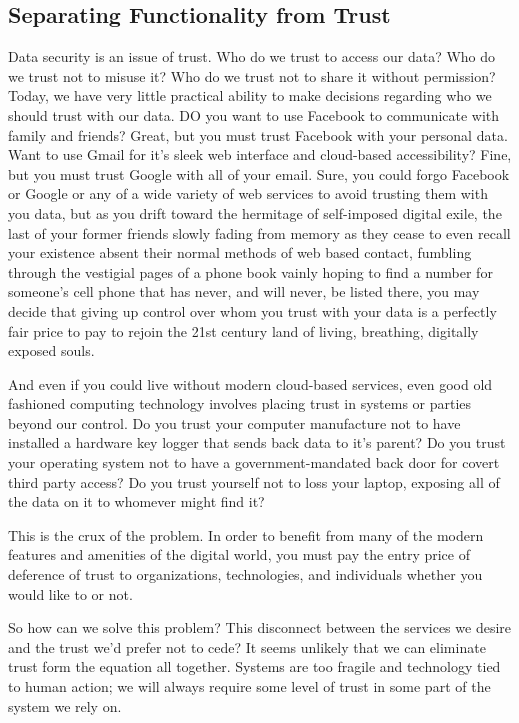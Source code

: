 \subsection{Separating Functionality from Trust}

Data security is an issue of trust. Who do we trust to access our
data? Who do we trust not to misuse it? Who do we trust not to share
it without permission? Today, we have very little practical ability to
make decisions regarding who we should trust with our data. DO you
want to use Facebook to communicate with family and friends? Great,
but you must trust Facebook with your personal data. Want to use Gmail
for it's sleek web interface and cloud-based accessibility? Fine, but
you must trust Google with all of your email. Sure, you could forgo
Facebook or Google or any of a wide variety of web services to avoid
trusting them with you data, but as you drift toward the hermitage of
self-imposed digital exile, the last of your former friends slowly
fading from memory as they cease to even recall your existence absent
their normal methods of web based contact, fumbling through the
vestigial pages of a phone book vainly hoping to find a number for
someone's cell phone that has never, and will never, be listed there,
you may decide that giving up control over whom you trust with your
data is a perfectly fair price to pay to rejoin the 21st century land
of living, breathing, digitally exposed souls.

And even if you could live without modern cloud-based services, even
good old fashioned computing technology involves placing trust in
systems or parties beyond our control. Do you trust your computer
manufacture not to have installed a hardware key logger that sends
back data to it's parent? Do you trust your operating system not to
have a government-mandated back door for covert third party access?
Do you trust yourself not to loss your laptop, exposing all of the
data on it to whomever might find it?

This is the crux of the problem. In order to benefit from many of the
modern features and amenities of the digital world, you must pay the
entry price of deference of trust to organizations, technologies, and
individuals whether you would like to or not.

So how can we solve this problem? This disconnect between the services
we desire and the trust we'd prefer not to cede? It seems unlikely
that we can eliminate trust form the equation all together. Systems
are too fragile and technology tied to human action; we will always
require some level of trust in some part of the system we rely on.

